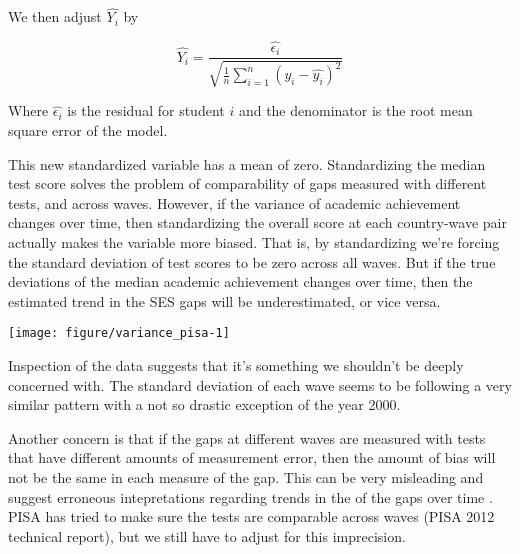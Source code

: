 \documentclass[11pt, a4paper]{article}\usepackage[]{graphicx}\usepackage[]{color}
\begin{document}
We then adjust \begin{math} \hat{Y_i} \end{math} by

\begin{equation}
\hat{Y_i} = \frac{\hat{\epsilon_i}}{\sqrt{\frac{1}{n} \sum_{i=1}^{n} (y_i - \hat{y_i})^2}}
\end{equation}


Where \begin{math}\hat{\epsilon_i}\end{math} is the residual for student \begin{math}i\end{math} and the denominator is the root mean square error of the model.

This new standardized variable has a mean of zero. Standardizing the median test score solves the problem of comparability of gaps measured with different tests, and across waves. However, if the variance of academic achievement changes over time, then standardizing the overall score at each country-wave pair actually makes the variable more biased. That is, by standardizing we're forcing the standard deviation of test scores to be zero across all waves. But if the true deviations of the median academic achievement changes over time, then the estimated trend in the SES gaps will be underestimated, or vice versa.



{\centering \texttt{[image: figure/variance\_pisa-1]} 

}




Inspection of the data suggests that it's something we shouldn't be deeply concerned with. The standard deviation of each wave seems to be following a very similar pattern with a not so drastic exception of the year 2000.

Another concern is that if the gaps at different waves are measured with tests that have different amounts of measurement error, then the amount of bias will not be the same in each measure of the gap. This can be very misleading and suggest erroneous intepretations regarding trends in the of the gaps over time \citep{reardon2011}. PISA has tried to make sure the tests are comparable across waves (PISA 2012 technical report), but we still have to adjust for this imprecision.
\end{document}
